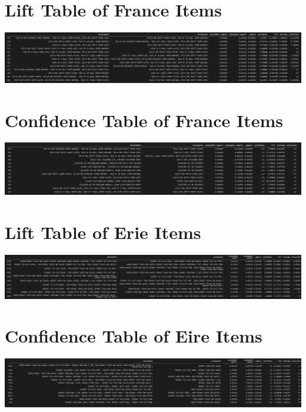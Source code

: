 \documentclass[a4paper,10pt]{article}
\begin{document}
\begin{appendices}
	\section{Lift Table of France Items}
	\label{appendix:francelift}
	\includegraphics[scale=0.2]{francelift}
	
	\section{Confidence Table of France Items}
	\label{appendix:franceconf}
	\includegraphics[scale=0.2]{franceconf}
	
	\section{Lift Table of Erie Items}
	\label{appendix:eirelift}
	\includegraphics[scale=0.19]{eirelift}
	
	\section{Confidence Table of Eire Items}
	\label{appendix:eireconf}
	\includegraphics[scale=0.19]{eireconf}
	
\end{appendices}

\newpage



\end{document}
